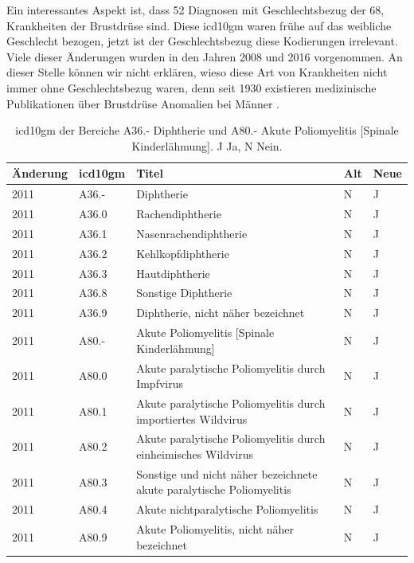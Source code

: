 Ein interessantes Aspekt ist, dass \textsf{52} Diagnosen mit Geschlechtsbezug der \textsf{68}, Krankheiten der Brustdrüse sind. Diese \ac{icd10gm} waren frühe auf das weibliche Geschlecht bezogen, jetzt ist der Geschlechtsbezug diese Kodierungen irrelevant. Viele dieser Änderungen wurden in den Jahren 2008 und 2016 vorgenommen. An dieser Stelle können wir nicht erklären, wieso diese Art von Krankheiten nicht immer ohne Geschlechtsbezug waren, denn seit 1930 existieren medizinische Publikationen über Brustdrüse Anomalien bei Männer \cite{bcm}. 

\begin{table}[ht]
	\centering
	\caption[Diphtherie und Poliomyelitis]{\ac{icd10gm} der Bereiche \textsf{A36.-} \textsf{Diphtherie} und \textsf{A80.-} \textsf{Akute Poliomyelitis [Spinale Kinderlähmung]}. \textsf{J} Ja, \textsf{N} Nein.}
	\label{tab:icdeuropa}
	\begin{tabular}{|l|l|p{8cm}|l|l|}
		\hline
		\rowcolor{lightgray} Änderung & \ac{icd10gm} & Titel & Alt & Neue \\ \hline
		2011 & A36.- & Diphtherie & N & J \\ \hline
		2011 & A36.0 & Rachendiphtherie & N & J \\ \hline
		2011 & A36.1 & Nasenrachendiphtherie & N & J \\ \hline
		2011 & A36.2 & Kehlkopfdiphtherie & N & J \\ \hline
		2011 & A36.3 & Hautdiphtherie & N & J \\ \hline
		2011 & A36.8 & Sonstige Diphtherie & N & J \\ \hline
		2011 & A36.9 & Diphtherie, nicht näher bezeichnet & N & J \\ \hline
		2011 & A80.- & Akute Poliomyelitis [Spinale Kinderlähmung] & N & J \\ \hline
		2011 & A80.0 & Akute paralytische Poliomyelitis durch Impfvirus & N & J \\ \hline
		2011 & A80.1 & Akute paralytische Poliomyelitis durch importiertes Wildvirus & N & J \\ \hline
		2011 & A80.2 & Akute paralytische Poliomyelitis durch einheimisches Wildvirus & N & J \\ \hline
		2011 & A80.3 & Sonstige und nicht näher bezeichnete akute paralytische Poliomyelitis & N & J \\ \hline
		2011 & A80.4 & Akute nichtparalytische Poliomyelitis & N & J \\ \hline
		2011 & A80.9 & Akute Poliomyelitis, nicht näher bezeichnet & N & J \\ \hline
	\end{tabular}
\end{table}

